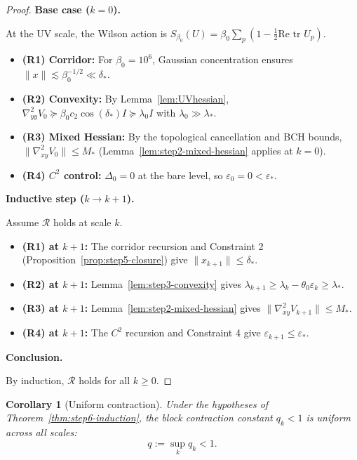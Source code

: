 \documentclass[11pt]{article}
\newtheorem{corollary}[theorem]{Corollary}
\theoremstyle{definition}
\newcommand{\1}{\mathbf{1}}
\begin{document}
\begin{proof}
\textbf{Base case ($k = 0$).}

At the UV scale, the Wilson action is $S_{\beta_0}(U) = \beta_0 \sum_p (1 - \frac{1}{2}\text{Re tr } U_p)$.

\begin{itemize}
\item \textbf{(R1) Corridor:} For $\beta_0 = 10^6$, Gaussian concentration ensures $\|x\| \lesssim \beta_0^{-1/2} \ll \delta_*$.
\item \textbf{(R2) Convexity:} By Lemma~\ref{lem:UVhessian}, $\nabla^2_{yy} V_0 \succeq \beta_0 c_2 \cos(\delta_*) I \succeq \lambda_0 I$ with $\lambda_0 \gg \lambda_*$.
\item \textbf{(R3) Mixed Hessian:} By the topological cancellation and BCH bounds, $\|\nabla^2_{xy} V_0\| \le M_*$ (Lemma~\ref{lem:step2-mixed-hessian} applies at $k=0$).
\item \textbf{(R4) $C^2$ control:} $\Delta_0 = 0$ at the bare level, so $\varepsilon_0 = 0 < \varepsilon_*$.
\end{itemize}

\textbf{Inductive step ($k \to k+1$).}

Assume $\mathcal{R}$ holds at scale $k$.

\begin{itemize}
\item \textbf{(R1) at $k+1$:} The corridor recursion and Constraint 2 (Proposition~\ref{prop:step5-closure}) give $\|x_{k+1}\| \le \delta_*$.
\item \textbf{(R2) at $k+1$:} Lemma~\ref{lem:step3-convexity} gives $\lambda_{k+1} \ge \lambda_k - \theta_0 \varepsilon_k \ge \lambda_*$.
\item \textbf{(R3) at $k+1$:} Lemma~\ref{lem:step2-mixed-hessian} gives $\|\nabla^2_{xy} V_{k+1}\| \le M_*$.
\item \textbf{(R4) at $k+1$:} The $C^2$ recursion and Constraint 4 give $\varepsilon_{k+1} \le \varepsilon_*$.
\end{itemize}

\textbf{Conclusion.}

By induction, $\mathcal{R}$ holds for all $k \ge 0$.
\end{proof}

\begin{corollary}[Uniform contraction]\label{cor:uniform-q}
Under the hypotheses of Theorem~\ref{thm:step6-induction}, the block contraction constant 
$q_k < 1$ is uniform across all scales:
\[
q := \sup_k q_k < 1.
\]
\end{corollary}
\end{document}
